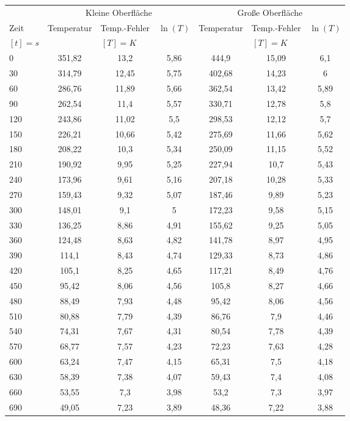 \documentclass[a4paper]{article}
\begin{document}
\begin{center}
\begin{tabular}{l|ccc|ccc}
 & \multicolumn{3}{c}{Kleine Oberfläche} & \multicolumn{3}{c}{Große Oberfläche}\\
Zeit & Temperatur & Temp.-Fehler & $\ln(T)$ & Temperatur & Temp.-Fehler & $\ln(T)$\\
$[t]=s$ & \multicolumn{3}{c}{$[T]=K$} & \multicolumn{3}{c}{$[T]=K$}\\
\hline
0 & 351,82 & 13,2 & 5,86 & 444,9 & 15,09 & 6,1\\
30 & 314,79 & 12,45 & 5,75 & 402,68 & 14,23 & 6\\
60 & 286,76 & 11,89 & 5,66 & 362,54 & 13,42 & 5,89\\
90 & 262,54 & 11,4 & 5,57 & 330,71 & 12,78 & 5,8\\
120 & 243,86 & 11,02 & 5,5 & 298,53 & 12,12 & 5,7\\
150 & 226,21 & 10,66 & 5,42 & 275,69 & 11,66 & 5,62\\
180 & 208,22 & 10,3 & 5,34 & 250,09 & 11,15 & 5,52\\
210 & 190,92 & 9,95 & 5,25 & 227,94 & 10,7 & 5,43\\
240 & 173,96 & 9,61 & 5,16 & 207,18 & 10,28 & 5,33\\
270 & 159,43 & 9,32 & 5,07 & 187,46 & 9,89 & 5,23\\
300 & 148,01 & 9,1 & 5 & 172,23 & 9,58 & 5,15\\
330 & 136,25 & 8,86 & 4,91 & 155,62 & 9,25 & 5,05\\
360 & 124,48 & 8,63 & 4,82 & 141,78 & 8,97 & 4,95\\
390 & 114,1 & 8,43 & 4,74 & 129,33 & 8,73 & 4,86\\
420 & 105,1 & 8,25 & 4,65 & 117,21 & 8,49 & 4,76\\
450 & 95,42 & 8,06 & 4,56 & 105,8 & 8,27 & 4,66\\
480 & 88,49 & 7,93 & 4,48 & 95,42 & 8,06 & 4,56\\
510 & 80,88 & 7,79 & 4,39 & 86,76 & 7,9 & 4,46\\
540 & 74,31 & 7,67 & 4,31 & 80,54 & 7,78 & 4,39\\
570 & 68,77 & 7,57 & 4,23 & 72,23 & 7,63 & 4,28\\
600 & 63,24 & 7,47 & 4,15 & 65,31 & 7,5 & 4,18\\
630 & 58,39 & 7,38 & 4,07 & 59,43 & 7,4 & 4,08\\
660 & 53,55 & 7,3 & 3,98 & 53,2 & 7,3 & 3,97\\
690 & 49,05 & 7,23 & 3,89 & 48,36 & 7,22 & 3,88\\

\end{tabular}
\end{center}
\end{document}
